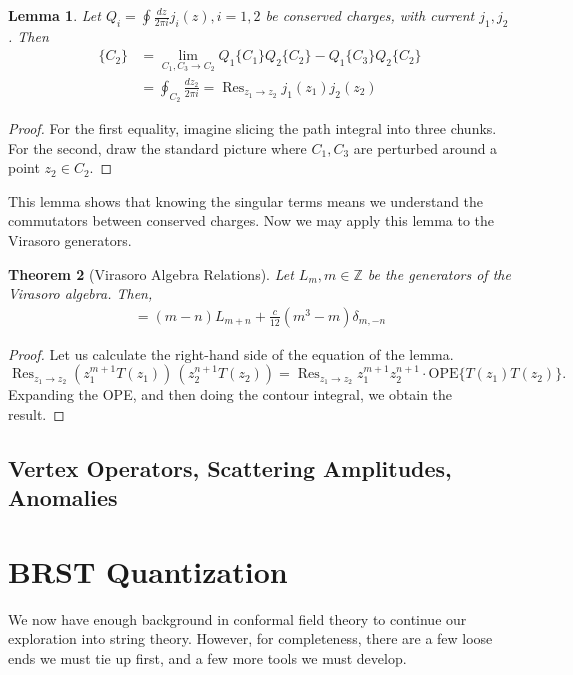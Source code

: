 \documentclass{report}
\theoremstyle{plain}
\newtheorem{theorem}{Theorem}[section]
\newtheorem{lemma}[theorem]{Lemma}
\theoremstyle{definition}
\theoremstyle{remark}
\newcommand{\FR}[2]{\frac{#1}{#2}}
\newcommand{\bZ}{\mathbb{Z}}
\DeclareMathOperator{\Res}{Res}
\begin{document}
\begin{lemma} Let $Q_i = \oint \FR{dz}{2\pi i} j_i(z), i=1,2$ be conserved
charges, with current $j_1,j_2$. Then
\begin{align*}
    [Q_1,Q_2]\{C_2\} &= \lim_{C_1,C_3 \to C_2} Q_1\{C_1\}Q_2\{C_2\}
    - Q_1\{C_3\} Q_2\{C_2\}\\
    &= \oint_{C_2} \FR{dz_2}{2\pi i} = \Res_{z_1\to z_2} j_1(z_1)j_2(z_2)
\end{align*}
\end{lemma}
\begin{proof}
For the first equality, imagine slicing the path integral into three chunks.
For the second, draw the standard picture where $C_1,C_3$ are perturbed
around a point $z_2\in C_2$.
\end{proof}
This lemma shows that knowing the singular terms means we understand the
commutators between conserved charges. Now we may apply this lemma to the
Virasoro generators.
\begin{theorem}[Virasoro Algebra Relations]
Let $L_m, m\in\bZ$ be the generators of the Virasoro algebra. Then,
\begin{align}
    [L_m,L_n] = (m-n)L_{m+n} + \FR{c}{12}(m^3-m)\delta_{m,-n}
    \label{Virasorogeneratorrelations}
\end{align}
\end{theorem}
\begin{proof}
Let us calculate the right-hand side of the equation of the lemma.
\[ \Res_{z_1\to z_2} (z_1^{m+1}T(z_1))\,(z_2^{n+1}T(z_2)) =\Res_{z_1\to z_2} z_1^{m+1}z_2^{n+1}\cdot \mathrm{OPE}\{T(z_1)T(z_2)\}. \]
Expanding the OPE, and then doing the contour integral, we obtain the
result.
\end{proof}

\section{Vertex Operators, Scattering Amplitudes, Anomalies}

\chapter{BRST Quantization}

We now have enough background in conformal field theory to continue
our exploration into string theory. However, for completeness, there
are a few loose ends we must tie up first, and a few more tools we
must develop.
\end{document}
